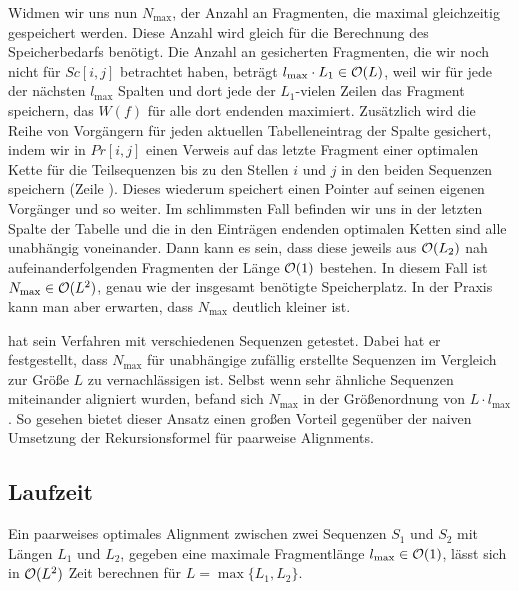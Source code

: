 Widmen wir uns nun $N_{\max}$, der Anzahl an Fragmenten, die maximal gleichzeitig gespeichert werden. Diese Anzahl wird gleich für die Berechnung des Speicherbedarfs benötigt. Die Anzahl an gesicherten Fragmenten, die wir noch nicht für $Sc[i,j]$ betrachtet haben, beträgt $l_{\max} \cdot L_1 \in \mathcal{O}(L)$, weil wir für jede der nächsten $l_{\max}$ Spalten und dort jede der $L_1$-vielen Zeilen das Fragment speichern, das $W(f)$ für alle dort endenden maximiert. Zusätzlich wird die Reihe von Vorgängern für jeden aktuellen Tabelleneintrag der Spalte gesichert, indem wir in $Pr[i,j]$ einen Verweis auf das letzte Fragment einer optimalen Kette für die Teilsequenzen bis zu den Stellen $i$ und $j$ in den beiden Sequenzen speichern (Zeile ). Dieses wiederum speichert einen Pointer auf seinen eigenen Vorgänger und so weiter. Im schlimmsten Fall befinden wir uns in der letzten Spalte der Tabelle und die in den Einträgen endenden optimalen Ketten sind alle unabhängig voneinander. Dann kann es sein, dass diese jeweils aus $\mathcal{O}(L_2)$ nah aufeinanderfolgenden Fragmenten der Länge $\mathcal{O}(1)$ bestehen. In diesem Fall ist $N_{\max} \in \mathcal{O}(L^2)$, genau wie der insgesamt benötigte Speicherplatz. In der Praxis kann man aber erwarten, dass $N_{\max}$ deutlich kleiner ist. 

\cite{m02} hat sein Verfahren mit verschiedenen Sequenzen getestet. Dabei hat er festgestellt, dass $N_{\max}$ für unabhängige zufällig erstellte Sequenzen im Vergleich zur Größe $L$ zu vernachlässigen ist. Selbst wenn sehr ähnliche Sequenzen miteinander aligniert wurden, befand sich $N_{\max}$ in der Größenordnung von $L \cdot l_{\max}$. So gesehen bietet dieser Ansatz einen großen Vorteil gegenüber der naiven Umsetzung der Rekursionsformel für paarweise Alignments.

\subsection{Laufzeit}

\begin{satz}[\cite{m02}]
	Ein paarweises optimales Alignment zwischen zwei Sequenzen $S_1$ und $S_2$ mit Längen $L_1$ und $L_2$, gegeben eine maximale Fragmentlänge $l_{\max} \in \mathcal{O}(1)$, lässt sich in $\mathcal{O}(L^2)$ Zeit berechnen für $L = \max\{L_1, L_2\}$.
\end{satz}

